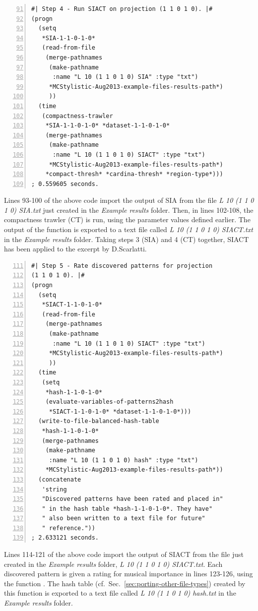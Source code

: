 \begin{Verbatim}[frame=single,numbers=left,firstnumber=91]
#| Step 4 - Run SIACT on projection (1 1 0 1 0). |#
(progn
  (setq
   *SIA-1-1-0-1-0*
   (read-from-file
    (merge-pathnames
     (make-pathname
      :name "L 10 (1 1 0 1 0) SIA" :type "txt")
     *MCStylistic-Aug2013-example-files-results-path*)
     ))
  (time
   (compactness-trawler
    *SIA-1-1-0-1-0* *dataset-1-1-0-1-0*
    (merge-pathnames
     (make-pathname
      :name "L 10 (1 1 0 1 0) SIACT" :type "txt")
     *MCStylistic-Aug2013-example-files-results-path*)
    *compact-thresh* *cardina-thresh* *region-type*)))
; 0.559605 seconds.
\end{Verbatim}
Lines 93-100 of the above code import the output of SIA from the file \emph{L 10 (1 1 0 1 0) SIA.txt} just created in the \emph{Example results} folder. Then, in lines 102-108, the compactness trawler (CT) is run, using the parameter values defined earlier. The output of the function  is exported to a text file called \emph{L 10 (1 1 0 1 0) SIACT.txt} in the \emph{Example results} folder. Taking steps 3 (SIA) and 4 (CT) together, SIACT has been applied to the excerpt by D.\hspace{0.1cm}Scarlatti.

\begin{Verbatim}[frame=single,numbers=left,firstnumber=111]
#| Step 5 - Rate discovered patterns for projection
(1 1 0 1 0). |#
(progn
  (setq
   *SIACT-1-1-0-1-0*
   (read-from-file
    (merge-pathnames
     (make-pathname
      :name "L 10 (1 1 0 1 0) SIACT" :type "txt")
     *MCStylistic-Aug2013-example-files-results-path*)
     ))
  (time
   (setq
    *hash-1-1-0-1-0*
    (evaluate-variables-of-patterns2hash
     *SIACT-1-1-0-1-0* *dataset-1-1-0-1-0*)))
  (write-to-file-balanced-hash-table
   *hash-1-1-0-1-0*
   (merge-pathnames
    (make-pathname
     :name "L 10 (1 1 0 1 0) hash" :type "txt")
    *MCStylistic-Aug2013-example-files-results-path*))
  (concatenate
   'string
   "Discovered patterns have been rated and placed in"
   " in the hash table *hash-1-1-0-1-0*. They have"
   " also been written to a text file for future"
   " reference."))
; 2.633121 seconds.
\end{Verbatim}
Lines 114-121 of the above code import the output of SIACT from the file  just created in the \emph{Example results} folder, \emph{L 10 (1 1 0 1 0) SIACT.txt}. Each discovered pattern is given a rating for musical importance in lines 123-126, using the function . The hash table (cf.~Sec.~\ref{sec:porting-other-file-types}) created by this function is exported to a text file called \emph{L 10 (1 1 0 1 0) hash.txt} in the \emph{Example results} folder.

